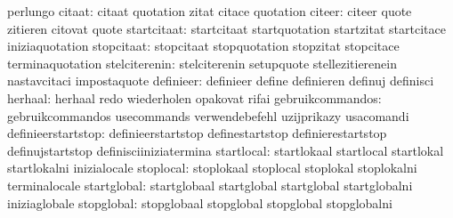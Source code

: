                                   perlungo
                          citaat: citaat                           quotation
                                  zitat                            citace
                                  quotation                        %
                          citeer: citeer                           quote
                                  zitieren                         citovat
                                  quote
                     startcitaat: startcitaat                      startquotation
                                  startzitat                       startcitace
                                  iniziaquotation
                      stopcitaat: stopcitaat                       stopquotation
                                  stopzitat                        stopcitace
                                  terminaquotation
                   stelciterenin: stelciterenin                    setupquote
                                  stellezitierenein                nastavcitaci
                                  impostaquote
                       definieer: definieer                        define
                                  definieren                       definuj
                                  definisci
                         herhaal: herhaal                          redo
                                  wiederholen                      opakovat
                                  rifai
                gebruikcommandos: gebruikcommandos                 usecommands
                                  verwendebefehl                   uzijprikazy
                                  usacomandi
              definieerstartstop: definieerstartstop               definestartstop
                                  definierestartstop               definujstartstop
                                  definisciiniziatermina
                      startlocal: startlokaal                      startlocal
                                  startlokal                       startlokalni
                                  inizialocale
                       stoplocal: stoplokaal                       stoplocal
                                  stoplokal                        stoplokalni
                                  terminalocale
                     startglobal: startglobaal                     startglobal
                                  startglobal                      startglobalni
                                  iniziaglobale
                      stopglobal: stopglobaal                      stopglobal
                                  stopglobal                       stopglobalni
